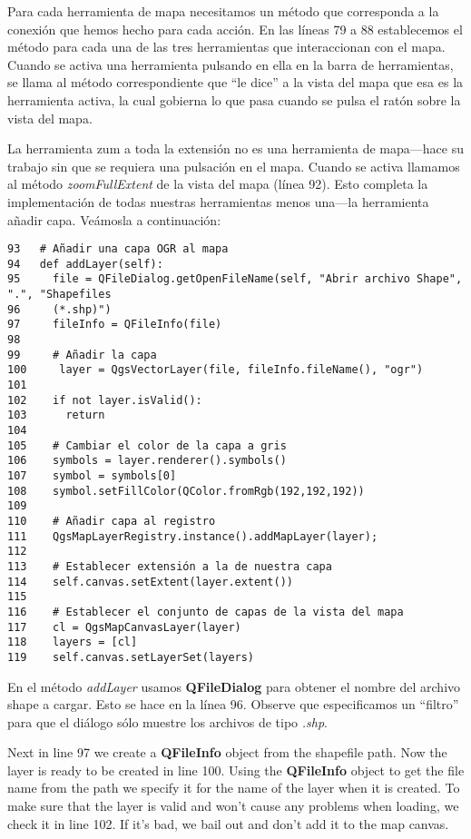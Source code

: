 Para cada herramienta de mapa necesitamos un método que corresponda a la conexión que hemos hecho para 
cada acción. En las líneas 79 a 88 establecemos el método para cada una de las tres herramientas que interaccionan 
con el mapa. Cuando se activa una herramienta pulsando en ella en la barra de herramientas, se llama al método 
correspondiente que ``le dice'' a la vista del mapa que esa es la herramienta activa, la cual gobierna lo que 
pasa cuando se pulsa el ratón sobre la vista del mapa.

La herramienta zum a toda la extensión no es una herramienta de mapa---hace su trabajo sin que se requiera una 
pulsación en el mapa. Cuando se activa llamamos al método \textsl{zoomFullExtent} de la vista del mapa (línea 92). 
Esto completa la implementación de todas nuestras herramientas menos una---la herramienta añadir capa. Veámosla a continuación:

\begin{verbatim}
93   # Añadir una capa OGR al mapa
94   def addLayer(self):
95     file = QFileDialog.getOpenFileName(self, "Abrir archivo Shape", ".", "Shapefiles
96     (*.shp)")
97     fileInfo = QFileInfo(file)
98 
99     # Añadir la capa
100     layer = QgsVectorLayer(file, fileInfo.fileName(), "ogr")
101
102    if not layer.isValid():
103      return
104
105    # Cambiar el color de la capa a gris
106    symbols = layer.renderer().symbols()
107    symbol = symbols[0]
108    symbol.setFillColor(QColor.fromRgb(192,192,192))
109
110    # Añadir capa al registro
111    QgsMapLayerRegistry.instance().addMapLayer(layer);
112
113    # Establecer extensión a la de nuestra capa
114    self.canvas.setExtent(layer.extent())
115
116    # Establecer el conjunto de capas de la vista del mapa
117    cl = QgsMapCanvasLayer(layer)
118    layers = [cl]
119    self.canvas.setLayerSet(layers)
\end{verbatim}

En el método \textsl{addLayer} usamos \textbf{QFileDialog} para obtener el nombre del archivo shape a cargar. 
Esto se hace en la línea 96. Observe que especificamos un ``filtro'' para que el diálogo sólo muestre los archivos 
de tipo \textsl{.shp}.

Next in line 97 we create a \textbf{QFileInfo} object from the shapefile path. Now the layer is
ready to be created in line 100. Using the \textbf{QFileInfo} object to get the file name
from the path we specify it for the name of the layer when it is created. To make sure that the layer is valid and won't
cause any problems when loading, we check it in line 102. If it's bad, we bail out and don't add it to
the map canvas.


